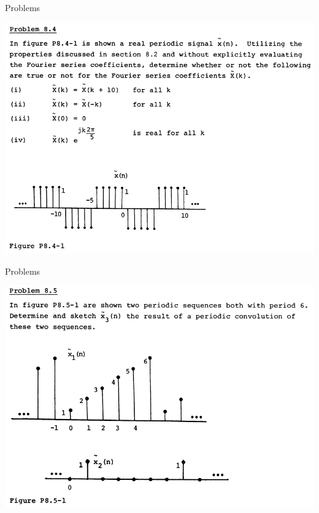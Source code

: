 \documentclass[pdflatex,compress,mathserif]{beamer}
\begin{document}
\begin{frame}{Problems}
	\begin{center}
		\includegraphics[width=0.9\linewidth]{img/img08}
	\end{center}
\end{frame}

\begin{frame}{Problems}
	\begin{center}
		\includegraphics[width=0.9\linewidth]{img/img09}
	\end{center}
\end{frame}
\end{document}
